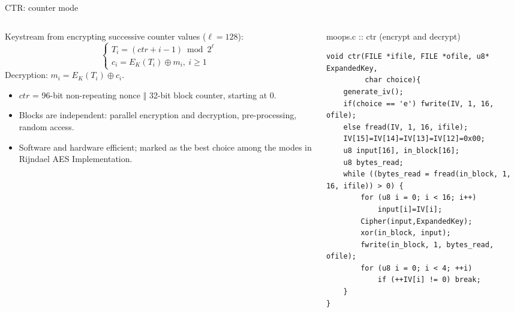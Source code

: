 \documentclass[aspectratio=169,10pt]{beamer}
\newcommand{\xor}{\oplus}
\begin{document}
\begin{frame}[fragile]{CTR: counter mode}
\begin{columns}[T]
\begin{column}{0.46\textwidth}
\small
Keystream from encrypting successive counter values ($\ell=128$):
\[ \begin{cases} T_i=(ctr+i-1)\bmod 2^{\ell}\\ c_i=E_K(T_i)\xor m_i,\ i\ge1\end{cases} \]
Decryption: $m_i=E_K(T_i)\xor c_i$.
\begin{itemize}\footnotesize
\item $ctr$ = 96-bit non-repeating nonce $\Vert$ 32-bit block counter, starting at 0.
\item Blocks are independent: \alert{parallel} encryption and decryption, pre-processing, random access.
\item Software and hardware efficient; marked as the best choice among the modes in Rijndael AES Implementation.
\end{itemize}
\end{column}
\begin{column}{0.51\textwidth}
\begin{tbox}{moops.c :: ctr (encrypt and decrypt)}
\begin{lstlisting}
void ctr(FILE *ifile, FILE *ofile, u8* ExpandedKey,
         char choice){
    generate_iv();
    if(choice == 'e') fwrite(IV, 1, 16, ofile);
    else fread(IV, 1, 16, ifile);
    IV[15]=IV[14]=IV[13]=IV[12]=0x00;
    u8 input[16], in_block[16];
    u8 bytes_read;
    while ((bytes_read = fread(in_block, 1, 16, ifile)) > 0) {
        for (u8 i = 0; i < 16; i++)
            input[i]=IV[i];
        Cipher(input,ExpandedKey);
        xor(in_block, input);
        fwrite(in_block, 1, bytes_read, ofile);
        for (u8 i = 0; i < 4; ++i)
            if (++IV[i] != 0) break;
    }
}
\end{lstlisting}
\end{tbox}
\end{column}
\end{columns}
\end{frame}
\end{document}
